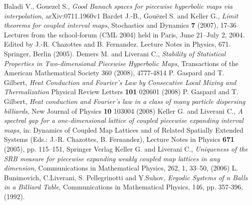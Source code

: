 \documentclass{amsart}
\numberwithin{equation}{section}
\begin{document}
\begin{thebibliography}{999}
\footnotesize

 Baladi V., Gouezel S., \emph{Good Banach spaces for piecewise hyperbolic maps via interpolation}, 	arXiv:0711.1960v1
 Bardet J.-B., Gou\"ezel S. and Keller G., \emph{Limit
    theorems for coupled interval maps}, Stochastics and Dynamics \textbf{7}
  (2007), 17-36
 Lectures from the school-forum (CML 2004) held in Paris, June
  21--July 2, 2004. Edited by J.-R. Chazottes and B. Fernandez. Lecture Notes
  in Physics, 671. Springer, Berlin (2005).
 Demers M. and Liverani C., \emph{Stability of
    Statistical Properties in Two-dimensional Piecewise Hyperbolic Maps},
  Transactions of the American Mathematical Society 360 (2008), 4777-4814
 P. Gaspard and T. Gilbert, \emph{Heat Conduction
    and Fourier's Law by Consecutive Local Mixing and Thermalization} Physical
  Review Letters {\bf 101} 020601 (2008)
 P. Gaspard and T. Gilbert, \emph{Heat conduction
    and Fourier's law in a class of many particle dispersing billiards}, New
  Journal of Physics {\bf 10} 103004 (2008)
 Keller G. and Liverani C., \emph{A spectral gap
    for a one-dimensional lattice of coupled piecewise expanding interval
    maps}, in: Dynamics of Coupled Map Lattices and of Related Spatially
  Extended Systems (Eds.: J.-R. Chazottes, B. Fernandez), Lecture Notes in
  Physics \textbf{671} (2005), pp. 115--151, Springer Verlag
 Keller G. and Liverani C., \emph{Uniqueness of the SRB measure for piecewise expanding weakly coupled map lattices in any dimension}, Communications in Mathematical Physics, 262, 1, 33--50, (2006)
 L. Bunimovich, C.Liverani, S. Pellegrinotti and Y.Suhov, \emph{Ergodic Systems of n Balls in a Billiard Table}, Communications in Mathematical Physics, 146, pp. 357-396, (1992).
\end{thebibliography}
\end{document}
